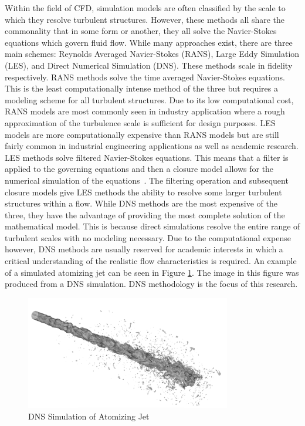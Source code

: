 Within the field of CFD, simulation models are often classified by the scale to which they resolve turbulent structures. However, these methods all share the commonality that in some form or another, they all solve the Navier-Stokes equations which govern fluid flow. While many approaches exist, there are three main schemes: Reynolds Averaged Navier-Stokes (RANS), Large Eddy Simulation (LES), and Direct Numerical Simulation (DNS). These methods scale in fidelity respectively. RANS methods solve the time averaged Navier-Stokes equations. This is the least computationally intense method of the three but requires a modeling scheme for all turbulent structures. Due to its low computational cost, RANS models are most commonly seen in industry application where a rough approximation of the turbulence scale is sufficient for design purposes. LES models are more computationally expensive than RANS models but are still fairly common in industrial engineering applications as well as academic research. LES methods solve filtered Navier-Stokes equations. This means that a filter is applied to the governing equations and then a closure model allows for the numerical simulation of the equations~\cite{pope}. The filtering operation and subsequent closure models give LES methods the ability to resolve some larger turbulent structures within a flow. While DNS methods are the most expensive of the three, they have the advantage of providing the most complete solution of the mathematical model. This is because direct simulations resolve the entire range of turbulent scales with no modeling necessary. Due to the computational expense however, DNS methods are usually reserved for academic interests in which a critical understanding of the realistic flow characteristics is required. An example of a simulated atomizing jet can be seen in Figure \ref{fig:DNSjet}. The image in this figure was produced from a DNS simulation. DNS methodology is the focus of this research.

\begin{figure}[htbp]
	\centering
	\includegraphics[width=0.8\textwidth]{figs/ACESjet}
	\caption{DNS Simulation of Atomizing Jet}
	\label{fig:DNSjet}
\end{figure}

